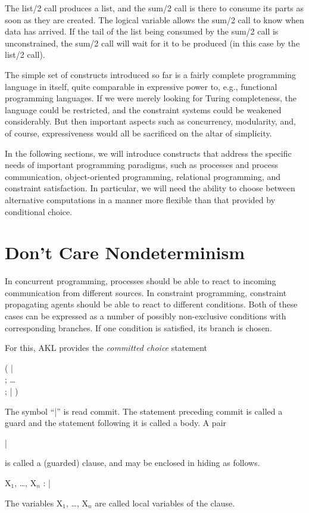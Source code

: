 The {\prog list/2} call produces a list, and the {\prog sum/2} call is
there to consume its parts as soon as they are created.  The logical
variable allows the {\prog sum/2} call to know when data has arrived.
If the tail of the list being consumed by the {\prog sum/2} call is
unconstrained, the {\prog sum/2} call will wait for it to be produced
(in this case by the {\prog list/2} call).

The simple set of constructs introduced so far is a fairly complete
programming language in itself, quite comparable in expressive power
to, e.g., functional programming languages.  If we were merely looking
for Turing completeness, the language could be restricted, and the
constraint systems could be weakened considerably.  But then important
aspects such as concurrency, modularity, and, of course,
expressiveness would all be sacrificed on the altar of simplicity.

In the following sections, we will introduce constructs that address
the specific needs of important programming paradigms, such as
processes and process communication, object-oriented programming,
relational programming, and constraint satisfaction.  In particular, we
will need the ability to choose between alternative computations in a
manner more flexible than that provided by conditional choice.

\section{Don't Care Nondeterminism}

In concurrent programming, processes should be able to react to
incoming communication from different sources.  In constraint
programming, constraint propagating agents should be able to react to
different conditions.  Both of these cases can be expressed as a number
of possibly non-exclusive conditions with corresponding branches.  If
one condition is satisfied, its branch is chosen.

For this, AKL provides the {\em committed choice} statement
%
\begin{progex}
(  |  \\
; \dots \\
;  |  )
\end{progex}%
%
The symbol ``{\prog |}'' is read commit.  The statement preceding
commit is called a guard and the statement following it is called a
body.  A pair
%
\begin{progex}
 | 
\end{progex}%
%
is called a (guarded) clause, and may be enclosed in hiding as follows.
%
\begin{progex}
X$_1$, \dots, X$_n$ :  | 
\end{progex}%
%
The variables {\prog X$_1$}, \dots, {\prog X$_n$} are called local variables
of the clause.

